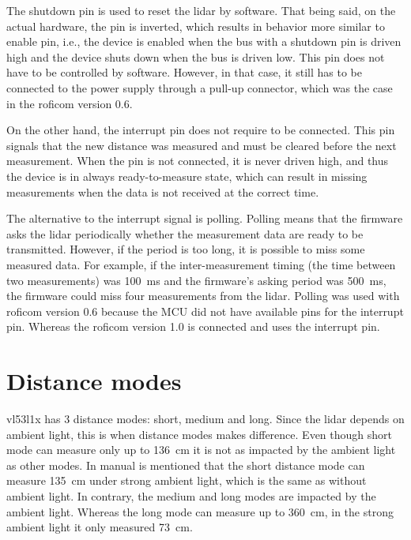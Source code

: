 \documentclass[
  digital,     %
  oneside,     %
  nosansbold,  %
  nocolorbold, %
  lof,         %
  lot,         %
]{fithesis4}
\begin{document}
The shutdown pin is used to reset the \acrshort{lidar} by software. That being said, on the actual hardware, the pin is inverted, which results in behavior more similar to enable pin, i.e., the device is enabled when the bus with a shutdown pin is driven high and the device shuts down when the bus is driven low. This pin does not have to be controlled by software. However, in that case, it still has to be connected to the power supply through a pull-up connector, which was the case in the \acrshort{roficom} version 0.6.

On the other hand, the interrupt pin does not require to be connected. This pin signals that the new distance was measured and must be cleared before the next measurement. When the pin is not connected, it is never driven high, and thus the device is in always ready-to-measure state, which can result in missing measurements when the data is not received at the correct time.

The alternative to the interrupt signal is polling. Polling means that the firmware asks the \acrshort{lidar} periodically whether the measurement data are ready to be transmitted. However, if the period is too long, it is possible to miss some measured data. For example, if the inter-measurement timing (the time between two measurements) was \qty{100}{\milli\second} and the firmware's asking period was \qty{500}{\milli\second}, the firmware could miss four measurements from the \acrshort{lidar}. Polling was used with \acrshort{roficom} version 0.6 because the MCU did not have available pins for the interrupt pin. Whereas the \acrshort{roficom} version 1.0 is connected and uses the interrupt pin.

\section{ Distance modes } \label{distance-modes}
\gls{vl53l1x} has 3 distance modes: short, medium and long. Since the \acrshort{lidar} depends on ambient light, this is when distance modes makes difference. Even though short mode can measure only up to \qty{136}{\centi\metre} it is not as impacted by the ambient light as other modes. In manual \cite{vl53l1x} is mentioned that the short distance mode can measure \qty{135}{\centi\metre} under strong ambient light, which is the same as without ambient light. In contrary, the medium and long modes are impacted by the ambient light. Whereas the long mode can measure up to \qty{360}{\centi\metre}, in the strong ambient light it only measured \qty{73}{\centi\metre}.
\end{document}
